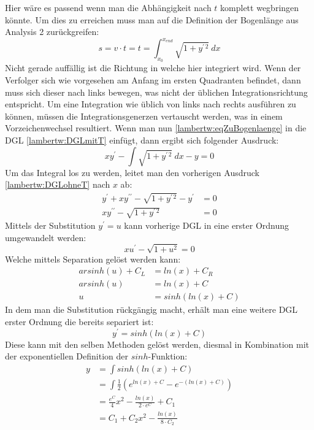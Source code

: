 Hier wäre es passend wenn man die Abhängigkeit nach \(t\) komplett wegbringen könnte. Um dies zu erreichen muss man auf die Definition der Bogenlänge aus Analysis 2 zurückgreifen:
\begin{equation}
	s
	= 
	v \cdot t
	=
	t
	=
	\int_{x_0}^{x_{end}}\sqrt{1+y^{\prime\, 2}} \: dx
	\label{lambertw:eqZuBogenlaenge}
\end{equation}
Nicht gerade auffällig ist die Richtung in welche hier integriert wird. Wenn der Verfolger sich wie vorgesehen am Anfang im ersten Quadranten befindet, dann muss sich dieser nach links bewegen, was nicht der üblichen Integrationsrichtung entspricht. Um eine Integration wie üblich von links nach rechts ausführen zu können, müssen die Integrationsgenerzen vertauscht werden, was in einem Vorzeichenwechsel resultiert. Wenn man nun \eqref{lambertw:eqZuBogenlaenge} in die DGL \eqref{lambertw:DGLmitT} einfügt, dann ergibt sich folgender Ausdruck:
\begin{equation}
	x y^{\prime} - \int\sqrt{1+y^{\prime\, 2}} \: dx - y
	= 0
	\label{lambertw:DGLohneT}
\end{equation}
Um das Integral los zu werden, leitet man den vorherigen Ausdruck \eqref{lambertw:DGLohneT} nach \(x\) ab:
\begin{align*}
	y^{\prime}+ xy^{\prime\prime} - \sqrt{1+y^{\prime\, 2}} - y^{\prime}
	&= 0 \\
	xy^{\prime\prime} - \sqrt{1+y^{\prime\, 2}}
	&= 0
\end{align*}
Mittels der Substitution \(y^{\prime} = u\) kann vorherige DGL in eine erster Ordnung umgewandelt werden:
\begin{equation*}
	xu^{\prime} - \sqrt{1+u^2}
	= 0
	\label{lambertw:DGLmitU}
\end{equation*}
Welche mittels Separation gelöst werden kann:
\begin{align*}
	arsinh(u) + C_L
	&=
	ln(x) + C_R \\
	arsinh(u)
	&=
	ln(x) + C \\
	u
	&=
	sinh(ln(x) + C)
\end{align*}
In dem man die Substitution rückgängig macht, erhält man eine weitere DGL erster Ordnung die bereits separiert ist:
\begin{equation}
	y^{\prime}
	=
	sinh(ln(x) + C)
\end{equation}
Diese kann mit den selben Methoden gelöst werden, diesmal in Kombination mit der exponentiellen Definition der \(sinh\)-Funktion:
\begin{align*}
	y
	&=
	\int sinh(ln(x) + C) \\
	&=
	\int \frac{1}{2} (e^{ln(x)+C} - e^{-(ln(x)+C)}) \\
	&=
	\frac{e^C}{4} x^2 - \frac{ln(x)}{2 \cdot e^C} + C_1 \\
	&=
	C_1 + C_2 x^2 - \frac{ln(x)}{8 \cdot C_2}
\end{align*}

